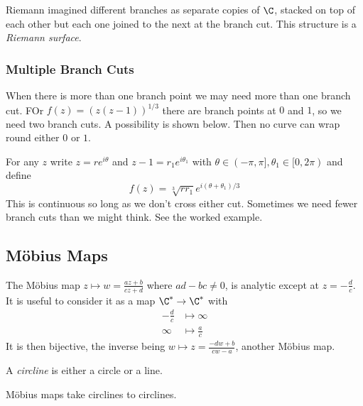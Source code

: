 \documentclass[a4paper]{article}
\begin{document}
Riemann imagined different branches as separate copies of \(\C\), stacked on top of each other but each one joined to the next at the branch cut. This structure is a \emph{Riemann surface}.

\subsubsection{Multiple Branch Cuts}

When there is more than one branch point we may need more than one branch cut. FOr \(f(z) = (z(z - 1))^{1/3}\) there are branch points at \(0\) and \(1\), so we need two branch cuts. A possibility is shown below. Then no curve can wrap round either \(0\) or \(1\).

For any \(z\) write \(z = re^{i\theta}\) and \(z - 1 = r_1e^{i\theta_1}\) with \(\theta \in (-\pi, \pi], \theta_1 \in [0, 2\pi)\) and define
\[
  f(z) = \sqrt[3]{rr_1} e^{i(\theta + \theta_1)/3}
\]
This is continuous so long as we don't cross either cut. Sometimes we need fewer branch cuts than we might think. See the worked example.

\subsection{Möbius Maps}

The Möbius map \(z \mapsto w = \frac{az + b}{cz + d}\) where \(ad - bc \neq 0\), is analytic except at \(z = -\frac{d}{c}\). It is useful to consider it as a map \(\C^* \to \C^*\) with
\begin{align*}
  -\frac{d}{c} &\mapsto \infty \\
  \infty &\mapsto \frac{a}{c}
\end{align*}
It is then bijective, the inverse being \(w \mapsto z = \frac{-dw + b}{cw - a}\), another Möbius map.

\begin{definition}[Circline]
  A \emph{circline} is either a circle or a line.
\end{definition}

Möbius maps take circlines to circlines.
\end{document}
